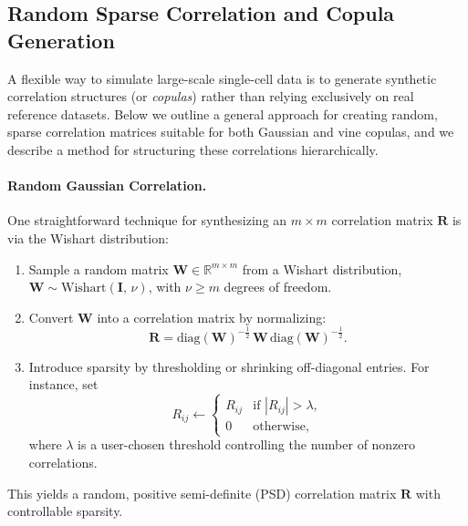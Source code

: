 \documentclass{article}
\begin{document}
\subsection{Random Sparse Correlation and Copula Generation}
\label{sec:randcopula}

A flexible way to simulate large-scale single-cell data is to generate synthetic correlation structures (or \emph{copulas}) rather than relying exclusively on real reference datasets. Below we outline a general approach for creating random, sparse correlation matrices suitable for both Gaussian and vine copulas, and we describe a method for structuring these correlations hierarchically.

\paragraph{Random Gaussian Correlation.}
One straightforward technique for synthesizing an $m\times m$ correlation matrix $\mathbf{R}$ is via the Wishart distribution:
\begin{enumerate}
	\item Sample a random matrix $\mathbf{W} \in \mathbb{R}^{m\times m}$ from a Wishart distribution, $\mathbf{W}\sim\text{Wishart}(\mathbf{I},\,\nu)$, with $\nu \ge m$ degrees of freedom.
	\item Convert $\mathbf{W}$ into a correlation matrix by normalizing:
	\[
	\mathbf{R} = \text{diag}(\mathbf{W})^{-\tfrac12}\,\mathbf{W}\,\text{diag}(\mathbf{W})^{-\tfrac12}.
	\]
	\item Introduce sparsity by thresholding or shrinking off-diagonal entries. For instance, set
	\[
	R_{ij} \leftarrow \begin{cases}
		R_{ij} & \text{if } |R_{ij}| > \lambda, \\
		0      & \text{otherwise,}
	\end{cases}
	\]
	where $\lambda$ is a user-chosen threshold controlling the number of nonzero correlations.
\end{enumerate}
This yields a random, positive semi-definite (PSD) correlation matrix $\mathbf{R}$ with controllable sparsity.
\end{document}
